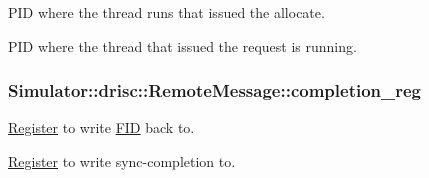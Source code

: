P\+I\+D where the thread runs that issued the allocate. 

P\+I\+D where the thread that issued the request is running. \hypertarget{struct_simulator_1_1drisc_1_1_remote_message_a0158ce09683551c7056bb825c6ed8fdd}{
\subsubsection[{completion\+\_\+reg}]{ Simulator\+::drisc\+::\+Remote\+Message\+::completion\+\_\+reg}}\label{struct_simulator_1_1drisc_1_1_remote_message_a0158ce09683551c7056bb825c6ed8fdd}


\hyperlink{class_simulator_1_1_register}{Register} to write \hyperlink{struct_simulator_1_1_f_i_d}{F\+I\+D} back to. 

\hyperlink{class_simulator_1_1_register}{Register} to write sync-\/completion to.

